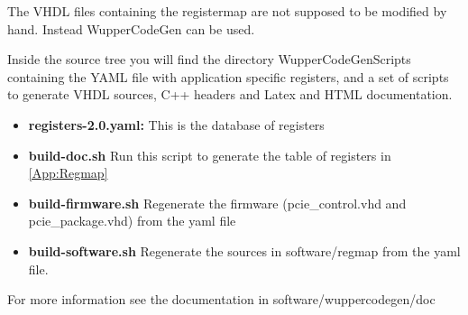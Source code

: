 The VHDL files containing the registermap are not supposed to be modified by hand. Instead WupperCodeGen can be used.

Inside the source tree you will find the directory WupperCodeGenScripts containing the YAML file with application specific registers, and a set of scripts to generate VHDL sources, C++ headers and Latex and HTML documentation.
\begin{itemize}
	\item \textbf{registers-2.0.yaml: }This is the database of registers 
	\item \textbf{build-doc.sh }Run this script to generate the table of registers in \ref{App:Regmap}
	\item \textbf{build-firmware.sh }Regenerate the firmware (pcie\_control.vhd and pcie\_package.vhd) from the yaml file
	\item \textbf{build-software.sh }Regenerate the sources in software/regmap from the yaml file.

\end{itemize}

For more information see the documentation in software/wuppercodegen/doc

\newpage